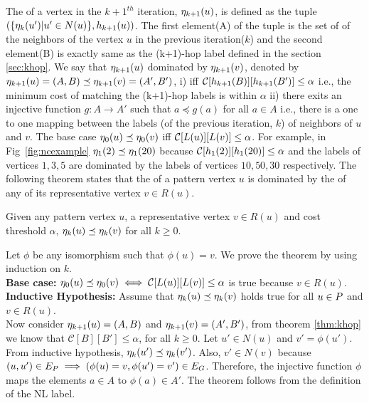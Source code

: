 The \ncl of a vertex in the ${k+1}^{th}$ iteration, $\eta_{k+1}(u)$, is defined
as the tuple $(\{\eta_{k}(u') | u' \in N(u)\}, h_{k+1}(u))$.  The
first element(A) of the tuple is the set of \ncl of the neighbors of the vertex $u$ in
the previous iteration($k$) and the second element(B) is exactly same as the (k+1)-hop
label defined in the section \ref{sec:khop}. We say that $\eta_{k+1}(u)$ dominated by
$\eta_{k+1}(v)$, denoted by $\eta_{k+1}(u) = (A, B) \preceq \eta_{k+1}(v) =
(A', B') $, i) iff $\mathcal{C}[h_{k+1}(B)][h_{k+1}(B')] \leq \alpha$ i.e., the minimum cost of
matching the (k+1)-hop labels is within $\alpha$ ii) there exits an injective
function $g\!\!:A\rightarrow A'$ such that $a \preceq g(a)$ for all $a \in A$
i.e., there is a one to one mapping between the \ncl labels (of the previous
iteration, $k$) of neighbors of $u$ and $v$.  The base case $\eta_{0}(u)
\preceq \eta_{0}(v)$ iff $\mathcal{C}[L(u)][L(v)] \leq \alpha$. For example, in
Fig~\ref{fig:ncexample} $\eta_{1}(2) \preceq \eta_{1}(20)$ because
$\mathcal{C}[h_{1}(2)][h_{1}(20)] \leq \alpha$ and the \ncl labels of vertices $1, 3, 5$ are
dominated by the \ncl labels of vertices $10, 50, 30$ respectively.  The
following theorem states that the \ncl of a pattern vertex $u$ is dominated by
the \ncl of any of its representative vertex $v \in  R(u)$.

\begin{thm} Given any pattern vertex $u$, a representative vertex $v \in R(u)$
    and cost threshold $\alpha$, $\eta_{k}(u) \preceq \eta_{k}(v)$ for all $k
    \geq 0$.  \begin{myproof} Let $\phi$ be any isomorphism such that $\phi(u) =
        v$.  We prove the theorem by using induction on $k$.\\ \textbf{Base
        case:} $\eta_{0}(u) \preceq \eta_{0}(v) \iff \mathcal{C}[L(u)][L(v)]
        \leq \alpha$ is true because $v \in R(u)$. \\ \textbf{Inductive
        Hypothesis:} Assume that $\eta_{k}(u) \preceq \eta_{k}(v)$ holds true
        for all $u \in P$ and $v \in R(u)$. \\ Now consider $\eta_{k+1}(u) =
        (A, B)$  and $ \eta_{k+1}(v) = (A', B') $, from theorem \ref{thm:khop}
        we know that $\mathcal{C}[B][B'] \leq \alpha$, for all $k \geq 0$.
        Let $u' \in N(u)$ and $v' = \phi(u')$. From inductive hypothesis, 
	$\eta_{k}(u') \preceq \eta_{k}(v')$. Also, $v' \in N(v)$ because
	$(u, u') \in E_P \implies (\phi(u)=v, \phi(u')=v') \in E_G$.
        Therefore,
        the injective function $\phi$ maps the elements $a \in A$ to $\phi(a)
        \in A'$.  The theorem follows from the definition of the NL label.
    \end{myproof} \label{thm:ncl} \end{thm}

